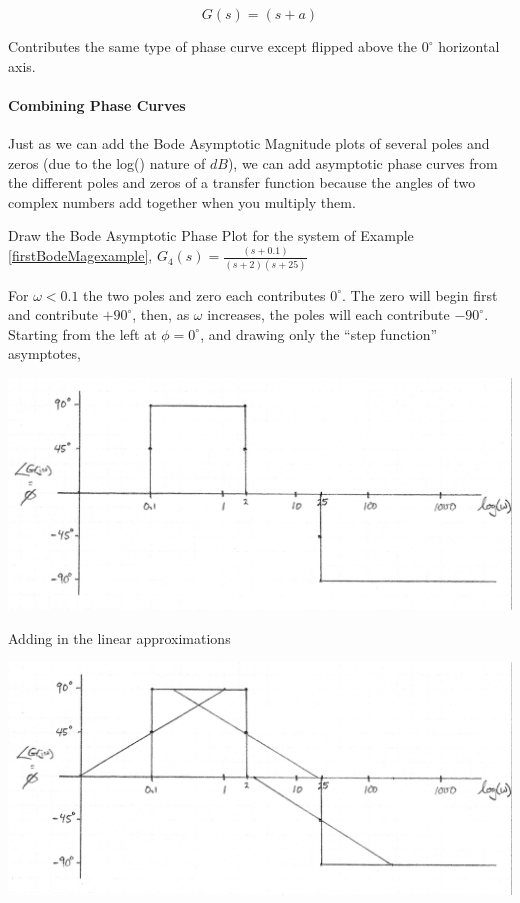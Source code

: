 \[
G(s) = (s+a)
\]

Contributes the same type of phase curve except flipped above the $0^\circ$ horizontal axis.

\paragraph{Combining Phase Curves}

Just as we can add the Bode Asymptotic Magnitude plots of several poles and zeros (due to the log() nature of $dB$), we can add asymptotic phase curves from the different poles and zeros of a transfer function because the angles of two complex numbers add together when you multiply them.

\begin{Example}

Draw the Bode Asymptotic Phase Plot for the system of Example \thechapter \ref{firstBodeMagexample},
$G_4(s) = \frac  {(s+0.1)}  {(s+2)(s+25)}$

For $\omega < 0.1$ the two poles and  zero each contributes $0^\circ$.  The zero will begin first and contribute $+90^\circ$, then, as $\omega$ increases, the  poles will each contribute $-90^\circ$.   Starting from the left at $\phi=0^\circ$, and drawing only the ``step function'' asymptotes,


\includegraphics[width=5.5in]{figs05/00758a.png}

Adding in the linear approximations

\includegraphics[width=5.5in]{figs05/00759a.png}


\end{Example}
